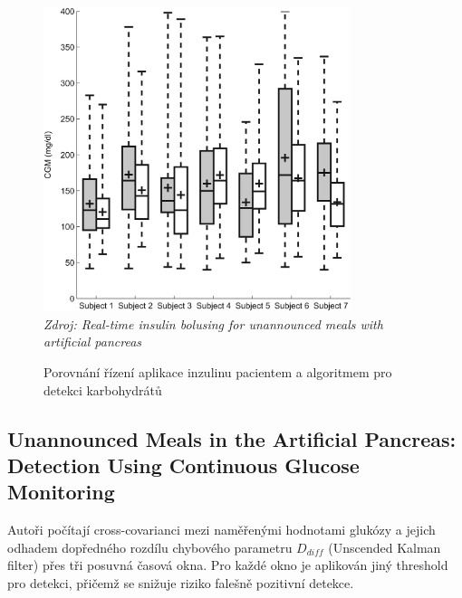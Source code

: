 \begin{figure}[H]
\caption{Porovnání řízení aplikace inzulinu pacientem a algoritmem pro detekci karbohydrátů}
\label{fig:turksoy2}
\centering
\includegraphics[width=0.8\textwidth]{img/analyzaCHO/turksoy3.jpg}\\
\textit{Zdroj: Real-time insulin bolusing for unannounced meals with artificial pancreas \citep{analyzaCHO.Turksoy}}
\end{figure}


\subsection{Unannounced Meals in the Artificial Pancreas: Detection Using Continuous Glucose Monitoring}
\label{ch:analyzaCHO:CrossCovariance}

Autoři \citet{analyzaCHO.CrossCovariance} počítají cross-covarianci mezi naměřenými hodnotami glukózy a jejich odhadem dopředného rozdílu chybového parametru $D_{diff}$ (Unscended Kalman filter) přes tři posuvná časová okna. Pro každé okno je aplikován jiný threshold pro detekci, přičemž se snižuje riziko falešně pozitivní detekce.

